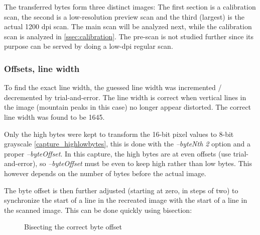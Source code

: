 \documentclass{article}
\begin{document}
The transferred bytes form three distinct images: The first section
is a calibration scan, the second is a low-resolution preview scan and the third (largest)
is the actual 1200 dpi scan. The main scan will be analyzed next,
while the calibration scan is analyzed in \autoref{ssec:calibration}.
The pre-scan is not studied further since its purpose can be served by
doing a low-dpi regular scan.

\subsubsection{Offsets, line width}

To find the exact line width, the guessed line width was incremented / decremented by trial-and-error.
The line width is correct when vertical lines in the image (mountain peaks in this case) no
longer appear distorted. The correct line width was found to be 1645.

Only the high bytes were kept to transform the 16-bit pixel values to 8-bit grayscale \autoref{capture_highlowbytes},
this is done with the {\it --byteNth 2} option and a proper {\it --byteOffset}. In this capture,
the high bytes are at even offsets (use trial-and-error), so {\it --byteOffset} must be even to keep
high rather than low bytes. This however depends on the number of bytes before the actual image.

The byte offset is then further adjusted (starting at zero, in steps of two)
to synchronize the start of a line in the recreated image
with the start of a line in the scanned image. This can be done quickly using bisection:

\begin{figure}[H]
  \caption{Bisecting the correct byte offset}
  \centering
  \hspace{3em}
  \label{extraction_first}
\end{figure}
\end{document}
